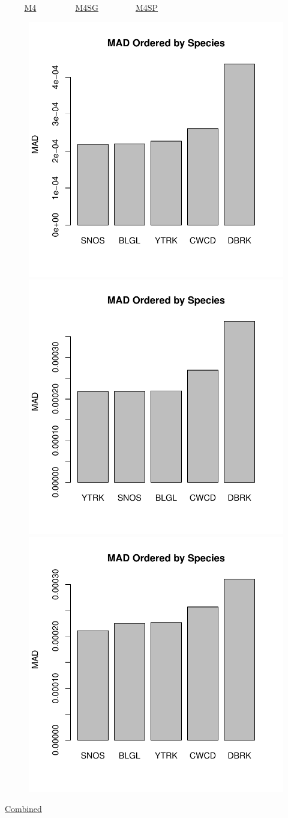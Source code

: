 \documentclass[ xcolor = pdftex, dvipsnames, table ]{beamer}
\begin{document}
\begin{frame}{$~~~~~~~~~$ \href{https://github.com/gasduster99/sppComp/tree/master/sscRuns/25319781982M4}{M4} $~~~~~~~~~~~~~~~~~~$ \href{https://github.com/gasduster99/sppComp/tree/master/sscRuns/25319781982M4IGSG}{M4SG} $~~~~~~~~~~~~~~~~~$ \href{https://github.com/gasduster99/sppComp/tree/master/sscRuns/25319781982M4IGSP}{M4SP} }
        \begin{figure}[ht!]
        \centering
        \hspace*{-1cm}
        \includegraphics[width=.4\textwidth]{../sscRuns/25319781982M4/sppTailMad68.pdf}
        \includegraphics[width=.4\textwidth]{../sscRuns/25319781982M4IGSG/sppTailMad68.pdf}
        \includegraphics[width=.4\textwidth]{../sscRuns/25319781982M4IGSP/sppTailMad68.pdf}
        \end{figure}
	\vspace{-1cm}
	\begin{center}
	\Large
	\href{https://github.com/gasduster99/sppComp/tree/master/try1/postSSC/25319781982M4IGSPSG}{Combined}
	\end{center}
\end{frame}
\end{document}
